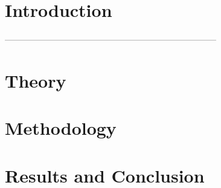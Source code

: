 
\addtolength{\evensidemargin}{-12mm}

%
%
\part[Introduction]{Introduction}
\label{part:introAndBackgroundTheory}



---------------------------------------------------------------------------
%
%
\part[Theory]{Theory}
\label{part:introAndBackgroundTheory}


%

\part[Methodology]{Methodology}
\label{part:body}







\part[Results and Conclusion]{Results and Conclusion}
\label{part:resultsAndConclusion}






%
%


